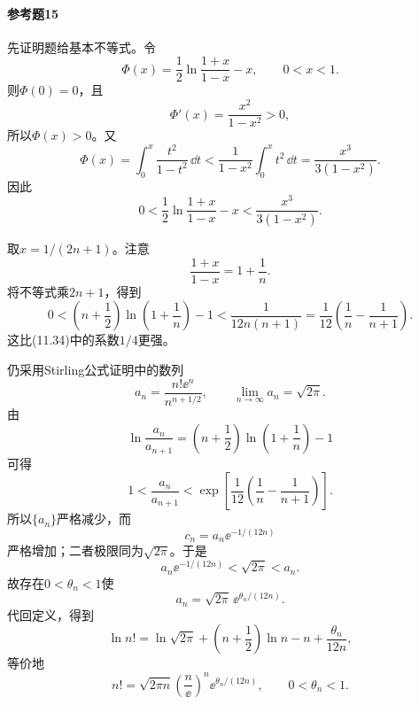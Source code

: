 \paragraph{参考题15}
\begin{xsolution}
先证明题给基本不等式。令
\[
 \Phi(x)=\frac12\ln\frac{1+x}{1-x}-x,
 \qquad 0<x<1.
\]
则$\Phi(0)=0$，且
\[
 \Phi'(x)=\frac{x^2}{1-x^2}>0,
\]
所以$\Phi(x)>0$。又
\[
 \Phi(x)=\int_0^x\frac{t^2}{1-t^2}\,\dd t
 <\frac1{1-x^2}\int_0^xt^2\,\dd t
 =\frac{x^3}{3(1-x^2)}.
\]
因此
\[
 0<\frac12\ln\frac{1+x}{1-x}-x
 <\frac{x^3}{3(1-x^2)}.
\]

取$x=1/(2n+1)$。注意
\[
 \frac{1+x}{1-x}=1+\frac1n.
\]
将不等式乘$2n+1$，得到
\[
 0<\left(n+\frac12\right)\ln\left(1+\frac1n\right)-1
 <\frac1{12n(n+1)}
 =\frac1{12}\left(\frac1n-\frac1{n+1}\right).
\]
这比(11.34)中的系数$1/4$更强。

仍采用Stirling公式证明中的数列
\[
 a_n=\frac{n!\ee^n}{n^{n+1/2}},
 \qquad \lim_{n\to\infty}a_n=\sqrt{2\pi}.
\]
由
\[
 \ln\frac{a_n}{a_{n+1}}
 =\left(n+\frac12\right)\ln\left(1+\frac1n\right)-1
\]
可得
\[
 1<\frac{a_n}{a_{n+1}}
 <\exp\left[\frac1{12}\left(\frac1n-\frac1{n+1}\right)\right].
\]
所以$\{a_n\}$严格减少，而
\[
 c_n=a_n\ee^{-1/(12n)}
\]
严格增加；二者极限同为$\sqrt{2\pi}$。于是
\[
 a_n\ee^{-1/(12n)}<\sqrt{2\pi}<a_n.
\]
故存在$0<\theta_n<1$使
\[
 a_n=\sqrt{2\pi}\,\ee^{\theta_n/(12n)}.
\]
代回定义，得到
\[
 \boxed{
 \ln n!=\ln\sqrt{2\pi}+\left(n+\frac12\right)\ln n-n
 +\frac{\theta_n}{12n}},
\]
等价地
\[
 \boxed{
 n!=\sqrt{2\pi n}\left(\frac n\ee\right)^n
 \ee^{\theta_n/(12n)},\qquad0<\theta_n<1}.
\]
\end{xsolution}

